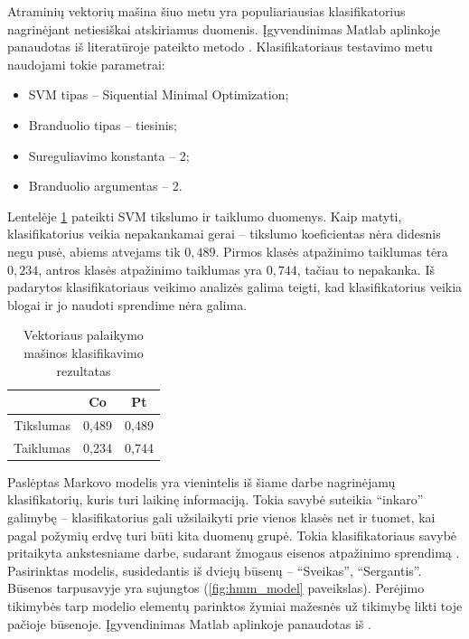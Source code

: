 \documentclass[]{vgtuef}
\begin{document}
Atraminių vektorių mašina \cite{Burges98atutorial} šiuo metu yra populiariausias klasifikatorius nagrinėjant netiesiškai atskiriamus duomenis. Įgyvendinimas Matlab aplinkoje panaudotas iš literatūroje pateikto metodo \cite{website:svm_implementation}. Klasifikatoriaus testavimo metu naudojami tokie parametrai:

\begin{itemize}
\item SVM tipas -- Siquential Minimal Optimization;
\item Branduolio tipas -- tiesinis;
\item Sureguliavimo konstanta -- 2;
\item Branduolio argumentas -- 2.
\end{itemize}

Lentelėje \ref{table:svm_scores} pateikti SVM tikslumo ir taiklumo duomenys. Kaip matyti, klasifikatorius veikia nepakankamai gerai -- tikslumo koeficientas nėra didesnis negu pusė, abiems atvejams tik $0,489$. Pirmos klasės atpažinimo taiklumas tėra $0,234$, antros klasės atpažinimo taiklumas yra $0,744$, tačiau to nepakanka. Iš padarytos klasifikatoriaus veikimo analizės galima teigti, kad klasifikatorius veikia blogai ir jo naudoti sprendime nėra galima.

\begin{table}[!t]
  \centering
  \renewcommand{\arraystretch}{1.3}
  \caption{Vektoriaus palaikymo mašinos klasifikavimo rezultatas}
  \label{table:svm_scores}
  \begin{tabular}{|c|c|c|} \hline
    & Co & Pt \\ \hline
    Tikslumas & 0,489 & 0,489 \\ \hline
    Taiklumas & 0,234 & 0,744 \\ \hline
  \end{tabular}
\end{table}

Paslėptas Markovo modelis \cite{18626} yra vienintelis iš šiame darbe nagrinėjamų klasifikatorių, kuris turi laikinę informaciją. Tokia savybė suteikia ``inkaro'' galimybę -- klasifikatorius gali užsilaikyti prie vienos klasės net ir tuomet, kai pagal požymių erdvę turi būti kita duomenų grupė. Tokia klasifikatoriaus savybė pritaikyta ankstesniame darbe, sudarant žmogaus eisenos atpažinimo sprendimą \cite{mano_darbas}. Pasirinktas modelis, susidedantis iš dviejų būsenų -- ``Sveikas'', ``Sergantis''. Būsenos tarpusavyje yra sujungtos (\ref{fig:hmm_model} paveikslas). Perėjimo tikimybės tarp modelio elementų parinktos žymiai mažesnės už tikimybę likti toje pačioje būsenoje. Įgyvendinimas Matlab aplinkoje panaudotas iš \cite{website:hmm_implementation}.
\end{document}
